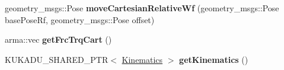 \begin{DoxyCompactItemize}
\item 
\hypertarget{classkukadu_1_1KukieControlQueue_ad0964c0cbfc3a44b7544396d5b9d0cba}{geometry\-\_\-msgs\-::\-Pose {\bfseries move\-Cartesian\-Relative\-Wf} (geometry\-\_\-msgs\-::\-Pose base\-Pose\-Rf, geometry\-\_\-msgs\-::\-Pose offset)}\label{classkukadu_1_1KukieControlQueue_ad0964c0cbfc3a44b7544396d5b9d0cba}

\item 
\hypertarget{classkukadu_1_1KukieControlQueue_ab6563d18842c941f87ae942c983e47bd}{arma\-::vec {\bfseries get\-Frc\-Trq\-Cart} ()}\label{classkukadu_1_1KukieControlQueue_ab6563d18842c941f87ae942c983e47bd}

\item 
\hypertarget{classkukadu_1_1KukieControlQueue_aeab6a219bc62aca73cdbac872a8aad7c}{K\-U\-K\-A\-D\-U\-\_\-\-S\-H\-A\-R\-E\-D\-\_\-\-P\-T\-R$<$ \hyperlink{classkukadu_1_1Kinematics}{Kinematics} $>$ {\bfseries get\-Kinematics} ()}\label{classkukadu_1_1KukieControlQueue_aeab6a219bc62aca73cdbac872a8aad7c}

\end{DoxyCompactItemize}
